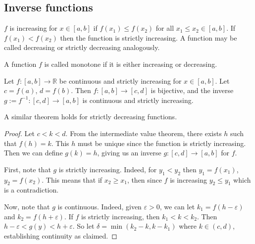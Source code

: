 \subsection{Inverse functions}
\begin{definition}
	\(f\) is increasing for \(x \in [a, b]\) if \(f(x_1) \leq f(x_2)\) for all \(x_1 \leq x_2 \in [a, b]\).
	If \(f(x_1) < f(x_2)\) then the function is strictly increasing.
	A function may be called decreasing or strictly decreasing analogously.
\end{definition}
\begin{definition}
	A function \(f\) is called monotone if it is either increasing or decreasing.
\end{definition}
\begin{theorem}
	Let \(f \colon [a, b] \to \mathbb R\) be continuous and strictly increasing for \(x \in [a, b]\).
	Let \(c = f(a)\), \(d = f(b)\).
	Then \(f \colon [a, b] \to [c, d]\) is bijective, and the inverse \(g := f^{-1} \colon [c, d] \to [a, b]\) is continuous and strictly increasing.
\end{theorem}
A similar theorem holds for strictly decreasing functions.
\begin{proof}
	Let \(c < k < d\).
	From the intermediate value theorem, there exists \(h\) such that \(f(h) = k\).
	This \(h\) must be unique since the function is strictly increasing.
	Then we can define \(g(k) = h\), giving us an inverse \(g \colon [c, d] \to [a, b]\) for \(f\).

	First, note that \(g\) is strictly increasing.
	Indeed, for \(y_1 < y_2\) then \(y_1 = f(x_1)\), \(y_2 = f(x_2)\).
	This means that if \(x_2 \geq x_1\), then since \(f\) is increasing \(y_2 \leq y_1\) which is a contradiction.

	Now, note that \(g\) is continuous.
	Indeed, given \(\varepsilon > 0\), we can let \(k_1 = f(h - \varepsilon)\) and \(k_2 = f(h + \varepsilon)\).
	If \(f\) is strictly increasing, then \(k_1 < k < k_2\).
	Then \(h - \varepsilon < g(y) < h + \varepsilon\).
	So let \(\delta = \min(k_2 - k, k - k_1)\) where \(k \in (c, d)\), establishing continuity as claimed.
\end{proof}
